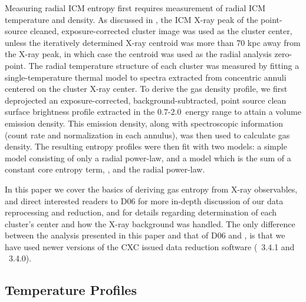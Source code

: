 \documentclass{emulateapj}
\begin{document}
Measuring radial ICM entropy first requires measurement of radial ICM
temperature and density. As discussed in \citet{xrayband}, the ICM
X-ray peak of the point-source cleaned, exposure-corrected cluster
image was used as the cluster center, unless the iteratively
determined X-ray centroid was more than 70 kpc away from the X-ray
peak, in which case the centroid was used as the radial analysis
zero-point. The radial temperature structure of each cluster was
measured by fitting a single-temperature thermal model to spectra
extracted from concentric annuli centered on the cluster X-ray
center. To derive the gas density profile, we first deprojected an
exposure-corrected, background-subtracted, point source clean surface
brightness profile extracted in the 0.7-2.0\keV\ energy range to
attain a volume emission density. This emission density, along with
spectroscopic information (count rate and normalization in each
annulus), was then used to calculate gas density. The resulting
entropy profiles were then fit with two models: a simple model
consisting of only a radial power-law, and a model which is the sum of
a constant core entropy term, \kna, and the radial power-law.

In this paper we cover the basics of deriving gas entropy from X-ray
observables, and direct interested readers to D06 for more in-depth
discussion of our data reprocessing and reduction, and
\citet{xrayband} for details regarding determination of each cluster's
center and how the X-ray background was handled. The only difference
between the analysis presented in this paper and that of D06 and
\citet{xrayband}, is that we have used newer versions of the CXC
issued data reduction software (\ciao\ 3.4.1 and \caldb\ 3.4.0).

\subsection{Temperature Profiles}
\label{sec:temppr}
\end{document}
